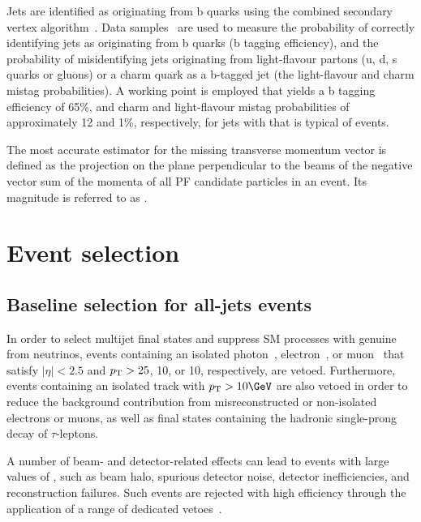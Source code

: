 Jets are identified as originating from b quarks using the combined
secondary vertex algorithm~\cite{CMS-PAS-BTV-12-001}. Data
samples~\cite{bjets} are used to measure the probability of correctly
identifying jets as originating from b quarks (b tagging efficiency),
and the probability of misidentifying jets originating from
light-flavour partons (u, d, s quarks or gluons) or a charm quark as a
b-tagged jet (the light-flavour and charm mistag probabilities). A
working point is employed that yields a b tagging efficiency of 65\%,
and charm and light-flavour mistag probabilities of approximately 12
and 1\%, respectively, for jets with \pt that is typical of \ttbar
events.

The most accurate estimator for the missing transverse momentum vector
\ptvecmiss is defined as the projection on the plane perpendicular to
the beams of the negative vector sum of the momenta of all PF
candidate particles in an event. Its magnitude is referred to as
\met.


\section{Event selection}
\label{sec:selection}

\subsection{Baseline selection for all-jets events}

In order to select multijet final states and suppress SM processes
with genuine \ptvecmiss from neutrinos, events containing an isolated
photon~\cite{PAS-EGM-10-006}, electron~\cite{PAS-EGM-10-004}, or
muon~\cite{PAS-MUO-10-004} that satisfy $|\eta| < 2.5$ and ${p_{\text T}} > 25$,
10, or 10\GeV, respectively, are vetoed. Furthermore, events
containing an isolated track with $\Pt > 10\GeV$ are also vetoed in
order to reduce the background contribution from misreconstructed or
non-isolated electrons or muons, as well as final states containing
the hadronic single-prong decay of $\tau$-leptons.

A number of beam- and detector-related effects can lead to events with
large values of \met, such as beam halo, spurious detector noise,
detector inefficiencies, and reconstruction failures. Such events are
rejected with high efficiency through the application of a range of
dedicated vetoes~\cite{RA1Paper2012, cms-met}. 

